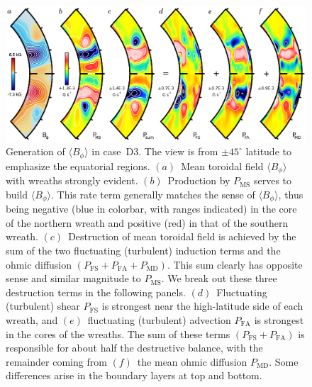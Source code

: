 \begin{figure}[!t]
  \begin{center}
    \includegraphics[width=\linewidth]{figs/chapter_7/Figure_13/Figure_13.eps}
  \end{center}
  \caption[Generation of $\langle B_\phi \rangle$ in case~D3]
          {Generation of $\langle B_\phi \rangle$ in case~D3.  
    The view is from $\pm 45^\circ$ latitude to emphasize the
    equatorial regions.  $(a)$~Mean toroidal field $\langle B_\phi
    \rangle$ with wreaths strongly evident.  $(b)$~Production by
    $P_\mathrm{MS}$ serves to build $\langle B_\phi \rangle$.
    This rate term generally matches the sense of $\langle B_\phi \rangle$,
    thus being negative (blue in colorbar, with ranges indicated) in the core of the
    northern wreath and positive (red) in that of the southern wreath.
    $(c)$~Destruction of mean toroidal field is achieved by the sum of
    the two fluctuating (turbulent) induction terms and the ohmic
    diffusion $\left(P_\mathrm{FS} + P_\mathrm{FA} + P_\mathrm{MD}\right)$.
    This sum clearly has opposite sense and similar magnitude to $P_\mathrm{MS}$.  
    We break out these three destruction terms in the following panels.
    $(d)$~Fluctuating (turbulent) shear
    $P_\mathrm{FS}$ is strongest near the high-latitude side of each
    wreath, and $(e)$~fluctuating (turbulent) advection $P_\mathrm{FA}$ is strongest
    in the cores of the wreaths.  The sum of these terms
    $\left(P_\mathrm{FS} + P_\mathrm{FA}\right)$ is
    responsible for about half the destructive balance, with the
    remainder coming from $(f)$~the mean ohmic diffusion $P_\mathrm{MD}$.
    Some differences arise in the boundary layers at top and bottom.
    \label{fig:D3_bphi_production}}
\end{figure}

